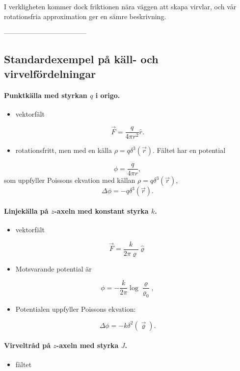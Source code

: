 \documentclass[%
oneside,                 %
final,                   %
10pt]{article}
\begin{document}
I verkligheten kommer dock friktionen nära väggen att skapa virvlar, och vår rotationsfria approximation ger en sämre beskrivning.

------------------------------------

\subsection{Standardexempel på käll- och virvelfördelningar}

\paragraph{Punktkälla med styrkan $q$ i origo.}
\begin{itemize}
\item vektorfält 
\end{itemize}

\noindent
$$
\vec F=\frac{q}{4\pi r^2}\hat r.
$$
\begin{itemize}
\item rotationsfritt, men med en källa $\rho=q\delta^3(\vec{r})$. Fältet har en potential
\end{itemize}

\noindent
$$
\phi=\frac{q}{4\pi r},
$$
som uppfyller Poissons ekvation med källan $\rho=q\delta^3(\vec{r})$, 
$$
\Delta\phi=-q\delta^3(\vec{r}).
$$

\paragraph{Linjekälla på $z$-axeln med konstant styrka $k$.}
\begin{itemize}
\item vektorfält
\end{itemize}

\noindent
$$
\vec F=\frac{k}{2\pi\varrho}\hat\varrho
$$
\begin{itemize}
\item Motsvarande potential är 
\end{itemize}

\noindent
$$
\phi=-\frac{k}{2\pi}\log\frac{\varrho}{\varrho_0},
$$
\begin{itemize}
\item Potentialen uppfyller Poissons ekvation:
\end{itemize}

\noindent
$$
\Delta\phi=-k\delta^2(\vec{\varrho}).
$$

\paragraph{Virveltråd på $z$-axeln med styrka $J$.}
\begin{itemize}
\item fältet 
\end{itemize}
\end{document}
